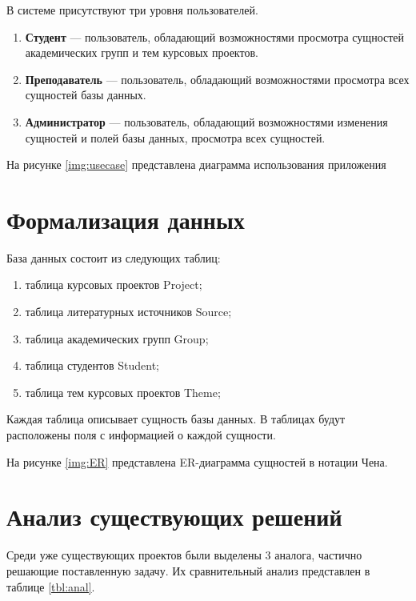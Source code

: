 В системе присутствуют три уровня пользователей.

\begin{enumerate}
	\item \textbf{Студент} --- пользователь, обладающий возможностями просмотра сущностей академических групп и тем курсовых проектов.
	\item \textbf{Преподаватель} --- пользователь, обладающий возможностями просмотра всех сущностей базы данных.
	\item \textbf{Администратор} --- пользователь, обладающий возможностями изменения сущностей и полей базы данных, просмотра всех сущностей.
\end{enumerate}

\pagebreak

На рисунке \ref{img:usecase} представлена диаграмма использования приложения
\newline
{}


\section{Формализация данных}

База данных состоит из следующих таблиц:
\begin{enumerate}
	\item таблица курсовых проектов Project;
	\item таблица литературных источников Source;
	\item таблица академических групп Group;
	\item таблица студентов Student;
	\item таблица тем курсовых проектов Theme;
\end{enumerate}

Каждая таблица описывает сущность базы данных. В таблицах будут расположены поля с информацией о каждой сущности.
\pagebreak

На рисунке \ref{img:ER} представлена ER-диаграмма сущностей в нотации Чена.
\newline


\section{Анализ существующих решений}
Среди уже существующих проектов были выделены 3 аналога, частично решающие поставленную задачу. Их сравнительный анализ представлен в таблице \ref{tbl:anal}.


